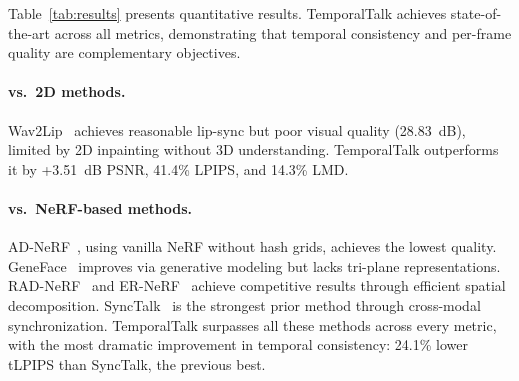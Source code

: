 \documentclass[10pt,twocolumn,letterpaper]{article}
\begin{document}
Table~\ref{tab:results} presents quantitative results.
TemporalTalk achieves state-of-the-art across all metrics, demonstrating that temporal consistency and per-frame quality are complementary objectives.

\begin{table}[t]
\centering
\caption{\textbf{Quantitative comparison on the May dataset.} Best in \textbf{bold}, second \underline{underlined}. TemporalTalk achieves state-of-the-art on all metrics with 24.1\% tLPIPS reduction vs.\ the strongest prior method. ``--'' indicates tLPIPS was not evaluated for that method.}
\label{tab:results}
\end{table}

\paragraph{vs.\ 2D methods.}
Wav2Lip~\cite{prajwal2020wav2lip} achieves reasonable lip-sync but poor visual quality (28.83~dB), limited by 2D inpainting without 3D understanding.
TemporalTalk outperforms it by +3.51~dB PSNR, 41.4\% LPIPS, and 14.3\% LMD.

\paragraph{vs.\ NeRF-based methods.}
AD-NeRF~\cite{guo2021adnerf}, using vanilla NeRF without hash grids, achieves the lowest quality.
GeneFace~\cite{ye2023geneface} improves via generative modeling but lacks tri-plane representations.
RAD-NeRF~\cite{tang2022radnerf} and ER-NeRF~\cite{li2023ernerf} achieve competitive results through efficient spatial decomposition.
SyncTalk~\cite{peng2024synctalk} is the strongest prior method through cross-modal synchronization.
TemporalTalk surpasses all these methods across every metric, with the most dramatic improvement in temporal consistency: 24.1\% lower tLPIPS than SyncTalk, the previous best.
\end{document}
